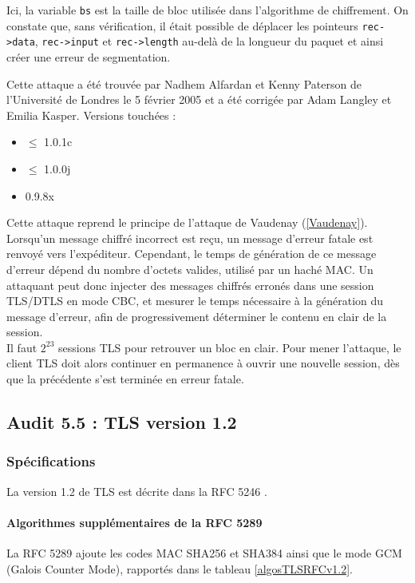 Ici, la variable \verb+bs+ est la taille de bloc utilisée dans l'algorithme de chiffrement.
On constate que, sans vérification, il était possible de déplacer les pointeurs \verb+rec->data+, \verb+rec->input+ et \verb+rec->length+  au-delà de la longueur du paquet et ainsi créer une erreur de segmentation.


Cette attaque \cite{CVE20130169} a été trouvée par Nadhem Alfardan et Kenny Paterson de l'Université de Londres le 5 février 2005 et a été corrigée par Adam Langley et Emilia Kasper. Versions touchées :
\begin{itemize}
\item $\le$ 1.0.1c 
\item $\le$ 1.0.0j 
\item 0.9.8x
\end{itemize}

Cette attaque reprend le principe de l'attaque de Vaudenay (\ref{Vaudenay}).\\

 
Lorsqu'un message chiffré incorrect est reçu, un message d'erreur fatale est renvoyé vers l'expéditeur. Cependant, le temps de génération de ce message d'erreur dépend du nombre d'octets valides, utilisé par un haché MAC. Un attaquant peut donc injecter des messages chiffrés erronés dans une session TLS/DTLS en mode CBC, et mesurer le temps nécessaire à la génération du message d'erreur, afin de progressivement déterminer le contenu en clair de la session.\\


Il faut $2^{23}$ sessions TLS pour retrouver un bloc en clair. Pour mener l'attaque, le client TLS doit alors continuer en permanence à ouvrir une nouvelle session, dès que la précédente s'est terminée en erreur fatale.



\subsection{Audit 5.5 : TLS version 1.2}
\subsubsection{Spécifications}

La version 1.2 de TLS est décrite dans la RFC 5246 \cite{rfc5246}.

\paragraph{Algorithmes supplémentaires de la RFC 5289} 
La RFC 5289 \cite{rfc5289} ajoute les codes MAC SHA256 et SHA384 ainsi que le mode GCM (Galois Counter Mode), rapportés dans le tableau \ref{algosTLSRFCv1.2}.

